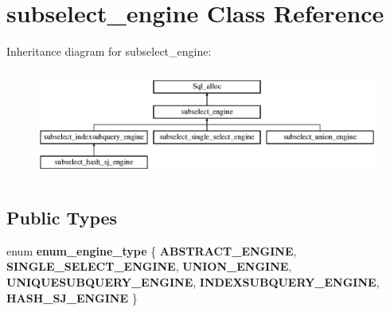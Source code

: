 \hypertarget{classsubselect__engine}{}\section{subselect\+\_\+engine Class Reference}
\label{classsubselect__engine}
Inheritance diagram for subselect\+\_\+engine\+:\begin{figure}[H]
\begin{center}
\leavevmode
\includegraphics[height=3.607085cm]{classsubselect__engine}
\end{center}
\end{figure}
\subsection*{Public Types}
\begin{DoxyCompactItemize}
\item 
\mbox{\label{classsubselect__engine_aad06e9bbdb6c3b93ac24d44a7fc67ddf}} 
enum {\bfseries enum\+\_\+engine\+\_\+type} \{ \newline
{\bfseries A\+B\+S\+T\+R\+A\+C\+T\+\_\+\+E\+N\+G\+I\+NE}, 
{\bfseries S\+I\+N\+G\+L\+E\+\_\+\+S\+E\+L\+E\+C\+T\+\_\+\+E\+N\+G\+I\+NE}, 
{\bfseries U\+N\+I\+O\+N\+\_\+\+E\+N\+G\+I\+NE}, 
{\bfseries U\+N\+I\+Q\+U\+E\+S\+U\+B\+Q\+U\+E\+R\+Y\+\_\+\+E\+N\+G\+I\+NE}, 
\newline
{\bfseries I\+N\+D\+E\+X\+S\+U\+B\+Q\+U\+E\+R\+Y\+\_\+\+E\+N\+G\+I\+NE}, 
{\bfseries H\+A\+S\+H\+\_\+\+S\+J\+\_\+\+E\+N\+G\+I\+NE}
 \}
\end{DoxyCompactItemize}
